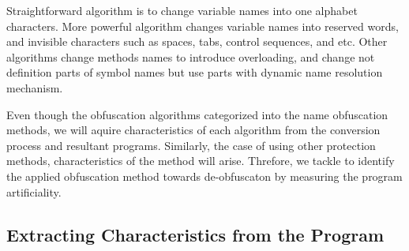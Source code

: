 \documentclass[conference]{IEEEtran}
\begin{document}
Straightforward algorithm is to change variable names into one
alphabet characters.  More powerful algorithm changes variable names
into reserved words, and invisible characters such as spaces, tabs,
control sequences, and etc\cite{dasho}.  Other algorithms change
methods names to introduce overloading\cite{tyma00patent}, and change
not definition parts of symbol names but use parts with dynamic name
resolution mechanism\cite{tamada07ieice}.

Even though the obfuscation algorithms categorized into the name
obfuscation methods, we will aquire characteristics of each algorithm
from the conversion process and resultant programs.
%
Similarly, the case of using other protection methods, characteristics
of the method will arise.
Threfore, we tackle to identify the applied obfuscation method towards
de-obfuscaton by measuring the program artificiality.

% 
% 

\subsection{Extracting Characteristics from the Program}
\end{document}
